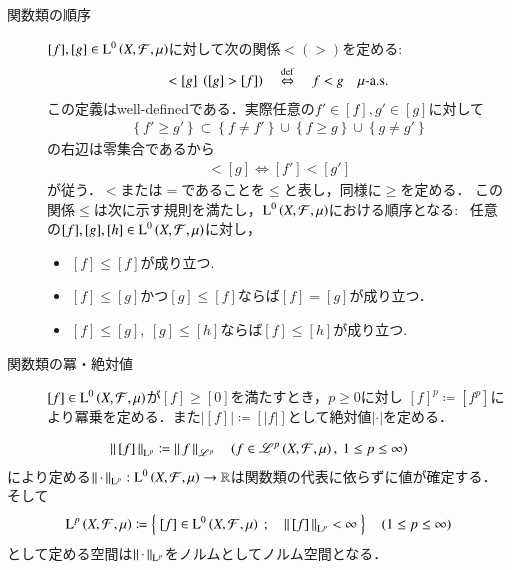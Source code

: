 \begin{description}
	\item[関数類の順序]
		$[f],[g] \in \operatorname{L}^{0} \left(X,\mathcal{F},\mu\right)$に対して次の関係$<(>)$を定める:
		\begin{align}
			[f] < [g]\ \left( [g] > [f] \right) \quad \DEF \quad f < g \quad \mbox{$\mu$-a.s.} \label{dfn:equiv_class_order}
		\end{align}
		この定義はwell-definedである．実際任意の$f' \in [f],g' \in [g]$に対して
		\begin{align}
			\left\{ f' \geq g' \right\} \subset \left\{ f \neq f' \right\} \cup \left\{ f \geq g \right\} \cup \left\{ g \neq g' \right\}
		\end{align}
		の右辺は零集合であるから
		\begin{align}
			[f] < [g] \Leftrightarrow [f'] < [g']
		\end{align}
		が従う．$<$または$=$であることを$\leq$と表し，同様に$\geq$を定める．
		この関係$\leq$は次に示す規則を満たし，$\operatorname{L}^{0} \left(X,\mathcal{F},\mu\right)$における順序となる:
		\ 任意の$[f],[g],[h] \in \operatorname{L}^{0} \left(X,\mathcal{F},\mu\right)$に対し，
		\begin{itemize}
			\item $[f] \leq [f]$が成り立つ.
			\item $[f] \leq [g]$かつ$[g] \leq [f]$ならば$[f] = [g]$が成り立つ．
			\item $[f] \leq [g],\ [g] \leq [h]$ならば$[f] \leq [h]$が成り立つ.
		\end{itemize}
		
	\item[関数類の冪・絶対値]
		$[f] \in \operatorname{L}^{0} \left(X,\mathcal{F},\mu\right)$が$[f] \geq [0]$を満たすとき，$p \geq 0$に対し
		$[f]^p \coloneqq [f^p]$により冪乗を定める．また$|[f]| \coloneqq [|f|]$として絶対値$|\cdot|$を定める．
\end{description}

\begin{screen}
	\begin{lem}[商空間におけるノルムの定義]
		\begin{align}
			\left\|\, [f]\, \right\|_{\mathrm{L}^p} \coloneqq \left\|\, f\, \right\|_{\mathscr{L}^p} \quad (f \in \mathscr{L}^{p} \left(X,\mathcal{F},\mu\right),\ 1 \leq p \leq \infty)
		\end{align}
		により定める$\left\|\, \cdot\, \right\|_{\mathrm{L}^p}:\operatorname{L}^{0} \left(X,\mathcal{F},\mu\right) \rightarrow \mathbb{R}$は関数類の代表に依らずに値が確定する．
		そして
		\begin{align}
			\operatorname{L}^{p} \left(X,\mathcal{F},\mu\right) \coloneqq \left\{\ [f] \in \operatorname{L}^{0} \left(X,\mathcal{F},\mu\right)\ ;\quad \left\|\, [f]\, \right\|_{\mathrm{L}^p} < \infty\ \right\} \quad (1 \leq p \leq \infty)
		\end{align}
		として定める空間は$\left\|\, \cdot\, \right\|_{\mathrm{L}^p}$をノルムとしてノルム空間となる．
	\end{lem}
\end{screen}

